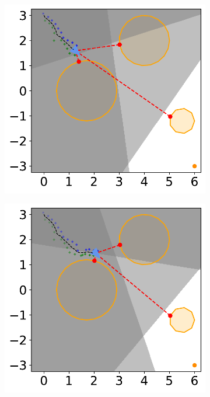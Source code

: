 \begin{figure}[H]
    \begin{subfigure}{0.35\textwidth}
        \centering
        \includegraphics[width=\textwidth]{figures/Simulations/sim1circles_delta/frame_2.pdf}
    \end{subfigure}%
    \hfil
    \begin{subfigure}{0.35\textwidth}
        \centering
        \includegraphics[width=\textwidth]{figures/Simulations/sim1circles_delta/frame_3.pdf}
    \end{subfigure}%
    

\end{figure}
